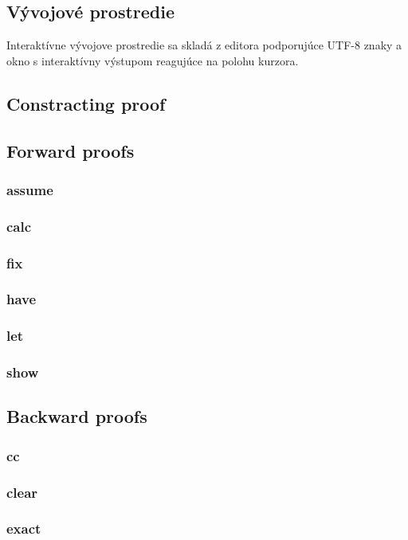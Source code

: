 \documentclass[a4paper,10pt,oneside]{report}%
\begin{document}
\subsection{Vývojové prostredie}
    Interaktívne vývojove prostredie sa skladá z editora podporujúce UTF-8 znaky
a okno s interaktívny výstupom reagujúce na polohu kurzora.

\subsection{Constracting proof}

\subsection{Forward proofs}
    \subsubsection{assume}
    \subsubsection{calc}
    \subsubsection{fix}
    \subsubsection{have}
    \subsubsection{let}
    \subsubsection{show}
\subsection{Backward proofs}
    \subsubsection{cc}
    \subsubsection{clear}
    \subsubsection{exact}
\end{document}
